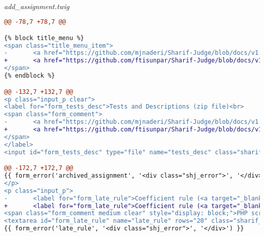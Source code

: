 ~\\
	\textit{add\_assignment.twig}
\begin{lstlisting}[language=diff, basicstyle=\ttfamily, frame=single,
columns=fullflexible, keepspaces=true, breaklines=true]
@@ -78,7 +78,7 @@

{% block title_menu %}
<span class="title_menu_item">
-       <a href="https://github.com/mjnaderi/Sharif-Judge/blob/docs/v1.4/add_assignment.md" target="_blank"><i class="fa fa-question-circle color1"></i> Help</a>
+       <a href="https://github.com/ftisunpar/Sharif-Judge/blob/docs/v1.4/add_assignment.md" target="_blank"><i class="fa fa-question-circle color1"></i> Help</a>
</span>
{% endblock %}

@@ -132,7 +132,7 @@
<p class="input_p clear">
<label for="form_tests_desc">Tests and Descriptions (zip file)<br>
<span class="form_comment">
-       <a href="https://github.com/mjnaderi/Sharif-Judge/blob/docs/v1.4/tests_structure.md" target="_blank">Use this structure</a>
+       <a href="https://github.com/ftisunpar/Sharif-Judge/blob/docs/v1.4/tests_structure.md" target="_blank">Use this structure</a>
</span>
</label>
<input id="form_tests_desc" type="file" name="tests_desc" class="sharif_input medium"/>

@@ -172,7 +172,7 @@
{{ form_error('archived_assignment', '<div class="shj_error">', '</div>') }}
</p>
<p class="input_p">
-       <label for="form_late_rule">Coefficient rule (<a target="_blank" href="https://github.com/mjnaderi/Sharif-Judge/blob/docs/v1.4/add_assignment.md#coefficient-rule">?</a>)</label><br>
+       <label for="form_late_rule">Coefficient rule (<a target="_blank" href="https://github.com/ftisunpar/Sharif-Judge/blob/docs/v1.4/add_assignment.md#coefficient-rule">?</a>)</label><br>
<span class="form_comment medium clear" style="display: block;">PHP script without &lt;?php ?&gt; tags</span>
<textarea id="form_late_rule" name="late_rule" rows="20" class="sharif_input add_text">{{ edit ? edit_assignment.late_rule : set_value('late_rule', default_late_rule) }}</textarea>
{{ form_error('late_rule', '<div class="shj_error">', '</div>') }}


\end{lstlisting}
